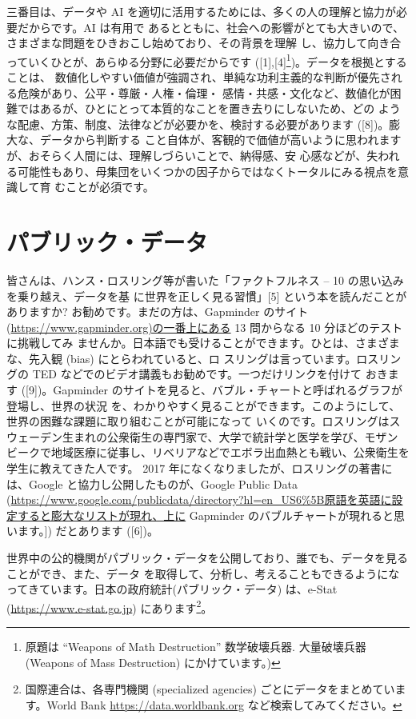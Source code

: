 \documentclass[
]{book}
\theoremstyle{definition}
\theoremstyle{definition}
\theoremstyle{definition}
\theoremstyle{definition}
\theoremstyle{remark}
\begin{document}
三番目は、データや AI を適切に活用するためには、多くの人の理解と協力が必要だからです。AI は有用で あるとともに、社会への影響がとても大きいので、さまざまな問題をひきおこし始めており、その背景を理解 し、協力して向き合っていくひとが、あらゆる分野に必要だからです ({[}1{]},{[}4{]}\footnote{ 原題は ``Weapons of Math Destruction'' 数学破壊兵器. 大量破壊兵器 (Weapons of Mass Destruction) にかけています。)})。データを根拠とすることは、 数値化しやすい価値が強調され、単純な功利主義的な判断が優先される危険があり、公平・尊厳・人権・倫理・ 感情・共感・文化など、数値化が困難ではあるが、ひとにとって本質的なことを置き去りにしないため、どの ような配慮、方策、制度、法律などが必要かを、検討する必要があります ({[}8{]})。膨大な、データから判断する こと自体が、客観的で価値が高いように思われますが、おそらく人間には、理解しづらいことで、納得感、安 心感などが、失われる可能性もあり、母集団をいくつかの因子からではなくトータルにみる視点を意識して育 むことが必須です。

\hypertarget{ux30d1ux30d6ux30eaux30c3ux30afux30c7ux30fcux30bf}{%
\section{パブリック・データ}\label{ux30d1ux30d6ux30eaux30c3ux30afux30c7ux30fcux30bf}}

皆さんは、ハンス・ロスリング等が書いた「ファクトフルネス -- 10 の思い込みを乗り越え、データを基 に世界を正しく見る習慣」{[}5{]} という本を読んだことがありますか? お勧めです。まだの方は、Gapminder のサイト(\url{https://www.gapminder.org)の一番上にある} 13 問からなる 10 分ほどのテストに挑戦してみ ませんか。日本語でも受けることができます。ひとは、さまざまな、先入観 (bias) にとらわれていると、ロ スリングは言っています。ロスリングの TED などでのビデオ講義もお勧めです。一つだけリンクを付けて おきます ({[}9{]})。Gapminder のサイトを見ると、バブル・チャートと呼ばれるグラフが登場し、世界の状況 を、わかりやすく見ることができます。このようにして、世界の困難な課題に取り組むことが可能になって いくのです。ロスリングはスウェーデン生まれの公衆衛生の専門家で、大学で統計学と医学を学び、モザン ビークで地域医療に従事し、リベリアなどでエボラ出血熱とも戦い、公衆衛生を学生に教えてきた人です。 2017 年になくなりましたが、ロスリングの著書には、Google と協力し公開したものが、Google Public Data (\url{https://www.google.com/publicdata/directory?hl=en_US6\%5B原語を英語に設定すると膨大なリストが現れ、上に} Gapminder のバブルチャートが現れると思います。{]}) だとあります ({[}6{]})。

世界中の公的機関がパブリック・データを公開しており、誰でも、データを見ることができ、また、データ を取得して、分析し、考えることもできるようになってきています。日本の政府統計(パブリック・データ) は、e-Stat (\url{https://www.e-stat.go.jp}) にあります\footnote{国際連合は、各専門機関 (specialized agencies) ごとにデータをまとめています。World Bank \url{https://data.worldbank.org} など検索してみてください。}。
\end{document}
